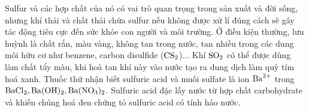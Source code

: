 \documentclass[11pt,a4paper]{article}
\begin{document}
\begin{ex}
Sulfur và các hợp chất của nó có vai trò quan trọng trong sản xuất và đời sống, nhưng khí thải và chất thải chứa sulfur nếu không được xử lí đúng cách sẽ gây tác động tiêu cực đến sức khỏe con người và môi trường.
\choiceTF
{\True Ở điều kiện thường, lưu huỳnh là chất rắn, màu vàng, không tan trong nước, tan nhiều trong các dung môi hữu cơ như benzene, carbon disulfide ($\ce{CS2}$)...}
{Khí $\ce{SO2}$ có thể được dùng làm chất tẩy màu, khi hoà tan khí này vào nước tạo ra dung dịch làm quỳ tím hoá xanh.}
{\True Thuốc thử nhận biết sulfuric acid và muối sulfate là ion $\ce{Ba^2+}$ trong $\ce{BaCl2, Ba(OH)2, Ba(NO3)2}$.}
{\True Sulfuric acid đặc lấy nước từ hợp chất carbohydrate và khiến chúng hoá đen chứng tỏ sulfuric acid có tính háo nước.}

\end{ex}
\end{document}

